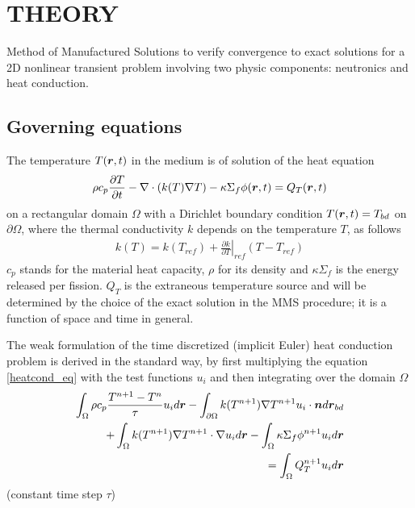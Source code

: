 \section*{THEORY}
\vspace{-4mm}
Method of Manufactured Solutions to verify convergence to exact solutions for a 2D nonlinear transient problem involving two physic components: neutronics and heat conduction.

\subsection*{Governing equations}

The temperature $T(\boldsymbol{r}, t)$ in the medium is of solution of the heat equation 
\begin{align}
  \rho c_p \frac{\partial T}{\partial t} 
  - \nabla\cdot(k(T) \nabla T) 
  - \kappa \Sigma_{f} \phi(\boldsymbol{r},t)
  = Q_T(\boldsymbol{r},t) \label{heatcond_eq}
\end{align}
on a rectangular domain $\Omega$ with a  Dirichlet boundary condition $T(\boldsymbol{r},t) = T_{bd}$ on $\partial\Omega$, where the thermal conductivity $k$ depends on the temperature $T$, as follows
\begin{align}
  k(T) = k(T_{ref}) + \left. \frac{\partial k}{\partial T}\right|_{ref} \left( T - T_{ref} \right)
\end{align}
%
$c_p$ stands for the material heat capacity, $\rho$ for its density and $\kappa \Sigma_{f}$ is the energy released per fission.  $Q_T$ is the extraneous temperature source and will be determined by the choice of the exact solution in the MMS procedure; it is a function of space and time in general.

The weak formulation of the time discretized (implicit Euler) heat conduction problem is derived in the standard way, by first multiplying the equation \eqref{heatcond_eq} with the test functions $u_{i}$ and then integrating over the domain $\Omega$
\begin{align}
  \int_{\Omega} \rho c_p \frac{T^{n+1}-T{^n}}{\tau} u_i d\boldsymbol{r} 
  - \int_{\partial\Omega} k(T^{n+1}) \nabla T^{n+1} u_i \cdot \boldsymbol{n} d\boldsymbol{r}_{bd}&  \nonumber \\
  + \int_{\Omega} k(T^{n+1}) \nabla T^{n+1} \cdot \nabla u_i d\boldsymbol{r}
  - \int_{\Omega} \kappa \Sigma_{f} \phi^{n+1} u_i d\boldsymbol{r}& \nonumber \\
  = \int_{\Omega} Q_T^{n+1} u_i d\boldsymbol{r}& \label{heatcond_wf}
\end{align}
(constant time step $\tau$)

